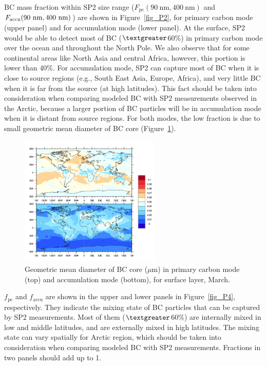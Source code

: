 \documentclass[11pt]{article}
\begin{document}
	BC mass fraction within SP2 size range ($F_{\text{pc}}(90~\text{nm}, 400~\text{nm})$ and
	$F_{\text{accu}}(90~\rm nm, 400~\rm nm)$) are shown in Figure~\ref{fig_P2}, for primary carbon mode
	(upper panel) and for accumulation mode (lower panel). At the surface,
	SP2 would be able to detect most of BC ($\textgreater$60$\%$) in primary
	carbon mode over the ocean and throughout the North Pole. We also observe that for some continental areas like North Asia and central Africa, however, this portion is lower than 40$\%$. For accumulation mode, SP2 can capture most of BC when it is
	close to source regions (e.g., South East Asia, Europe, Africa), and very little BC when it is far from the source (at high latitudes). This fact should be taken into consideration when comparing modeled BC with SP2 measurements observed in the Arctic, because a larger portion of BC particles will be in accumulation mode when it is distant from source regions. For both modes, the low fraction is due to small geometric mean diameter of BC core (Figure~\ref{fig_P3}).
	
	
	\begin{figure}[!h] 
		\begin{center}
			\includegraphics[width = 0.6\textwidth]{Rplot03}
			\caption[]{\label{fig_P3} Geometric mean diameter of BC core ($\mu$m) in primary carbon mode (top) and accumulation mode (bottom), for surface layer, March.}
		\end{center}
	\end{figure}
	
	
	
	$f_{\text{pc}}$ and $f_{\text{accu}}$ are shown in the upper
	and lower panels in Figure~\ref{fig_P4}, respectively. They indicate the mixing state of BC particles
	that can be captured by SP2 measurements. Most of them
	($\textgreater$60$\%$) are internally mixed in low and middle
	latitudes, and are externally mixed in high latitudes. The mixing state can vary spatially for Arctic region,
	which should be taken into consideration when comparing modeled BC
	with SP2 measurements. Fractions in two panels should add up to 1.
	
\end{document}
